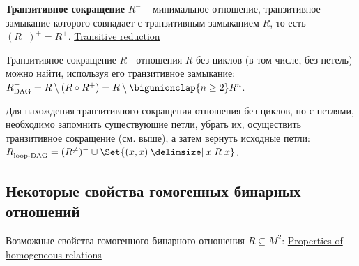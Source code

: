 \documentclass[a4paper,10pt]{article}
\begin{document}
\begin{terms}
\begin{terms}
        \item \textbf{Транзитивное сокращение} $R^{-}$ \--- минимальное отношение, транзитивное замыкание которого совпадает с транзитивным замыканием $R$, то есть $(R^{-})^{+} = R^{+}$.
        \hfill\href{https://en.wikipedia.org/wiki/Transitive_reduction}{Transitive reduction}

        Транзитивное сокращение $R^{-}$ отношения $R$ без циклов (в том числе, без петель) можно найти, используя его транзитивное замыкание: $R^{-}_{\text{DAG}} = R \setminus (R \circ R^{+}) = R \setminus \bigunionclap{n \geq 2} R^n$.

        Для нахождения транзитивного сокращения отношения без циклов, но с петлями, необходимо запомнить существующие петли, убрать их, осуществить транзитивное сокращение (см. выше), а затем вернуть исходные петли: $R^{-}_{\text{loop-DAG}} = (R^{\neq})^{-} \union \Set{(x,x) \given x \rel x}$.
    \end{terms}
\end{terms}


\newpage


\subsection{Некоторые свойства гомогенных бинарных отношений}

Возможные свойства гомогенного бинарного отношения $R \subseteq M^2$:
\hfill\href{https://en.wikipedia.org/wiki/Homogeneous_relation#Properties}{Properties of homogeneous relations}
\end{document}
